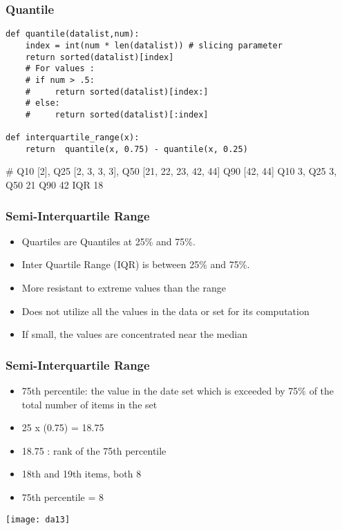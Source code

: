 \begin{frame}[fragile]\frametitle{Quantile}
\begin{lstlisting}
def quantile(datalist,num):
    index = int(num * len(datalist)) # slicing parameter
    return sorted(datalist)[index]
    # For values :
    # if num > .5:
    #     return sorted(datalist)[index:]
    # else:
    #     return sorted(datalist)[:index]

def interquartile_range(x):
    return	quantile(x, 0.75) - quantile(x, 0.25)
\end{lstlisting}
\# Q10 [2], Q25 [2, 3, 3, 3], Q50 [21, 22, 23, 42, 44] Q90 [42, 44]
Q10 3, Q25 3, Q50 21 Q90 42 IQR 18
\end{frame}

\begin{frame}[fragile]\frametitle{Semi-Interquartile Range}	
\begin{itemize}
\item Quartiles are Quantiles at 25\% and 75\%.
\item Inter Quartile Range (IQR) is between 25\% and 75\%.
\item More resistant to extreme values than the range
\item Does not utilize all the values in the data or set for its computation
\item If small, the values are concentrated near the median
\end{itemize}
\end{frame}

\begin{frame}[fragile]\frametitle{Semi-Interquartile Range}	
\begin{itemize}
\item 75th percentile: the value in the date set which is exceeded by 75\% of the total number of items in the set
\item 25 x (0.75) = 18.75
\item 18.75 : rank of the 75th percentile
\item 18th  and 19th items, both  8
\item 75th percentile = 8
\end{itemize}
\begin{center}
\texttt{[image: da13]}
\end{center}
\end{frame}


